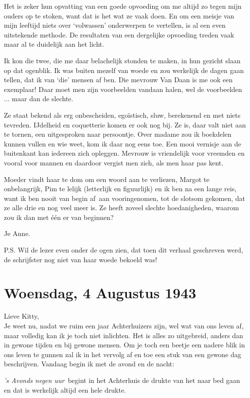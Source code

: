 \documentclass{book}
\begin{document}
Het is zeker hun opvatting van een goede opvoeding om me altijd zo tegen mijn
ouders op te stoken, want dat is het wat ze vaak doen. En om een meisje van mijn
leeftijd niets over `volwassen' onderwerpen te vertellen, is al een even
uitstekende methode. De resultaten van een dergelijke opvoeding treden vaak maar
al te duidelijk aan het licht.

Ik kon die twee, die me daar belachelijk stonden te maken, in hun gezicht slaan
op dat ogenblik. Ik was buiten mezelf van woede en zou werkelijk de dagen gaan
tellen, dat ik van `die' mensen af ben. Die mevrouw Van Daan is me ook een
exemplaar! Daar moet men zijn voorbeelden vandaan halen, wel de voorbeelden ...
maar dan de slechte.

Ze staat bekend als erg onbescheiden, egoïstisch, sluw, berekenend en met niets
tevreden. IJdelheid en coquetterie komen er ook nog bij. Ze is, daar valt niet
aan te tornen, een uitgesproken naar persoontje. Over madame zou ik boekdelen
kunnen vullen en wie weet, kom ik daar nog eens toe. Een mooi vernisje aan de
buitenkant kan iedereen zich opleggen.  Mevrouw is vriendelijk voor vreemden en
vooral voor mannen en daardoor vergist men zich, als men haar pas kent.

Moeder vindt haar te dom om een woord aan te verliezen, Margot te onbelangrijk,
Pim te lelijk (letterlijk en figuurlijk) en ik ben na een lange reis, want ik
ben nooit van begin af~aan vooringenomen, tot de slotsom gekomen, dat ze alle
drie en nog veel meer is. Ze heeft zoveel slechte hoedanigheden, waarom zou ik
dan met één er van beginnen?

Je Anne.

P.S. Wil de lezer even onder de ogen zien, dat toen dit verhaal geschreven werd,
de schrijfster nog niet van haar woede bekoeld was!

\section*{Woensdag, 4 Augustus 1943}

Lieve Kitty,\\
Je weet nu, nadat we ruim een jaar Achterhuizers zijn, wel wat
van ons leven af, maar volledig kan ik je toch niet inlichten. Het is alles zo
uitgebreid, anders dan in gewone tijden en bij gewone mensen. Om je toch een
beetje een nadere blik in ons leven te gunnen zal ik in het vervolg af en toe
een stuk van een gewone dag beschrijven. Vandaag begin ik met de avond en de
nacht:

\emph{'s Avonds negen uur}~begint in het Achterhuis de drukte van het naar bed
gaan en dat is werkelijk altijd een hele drukte.
\end{document}
